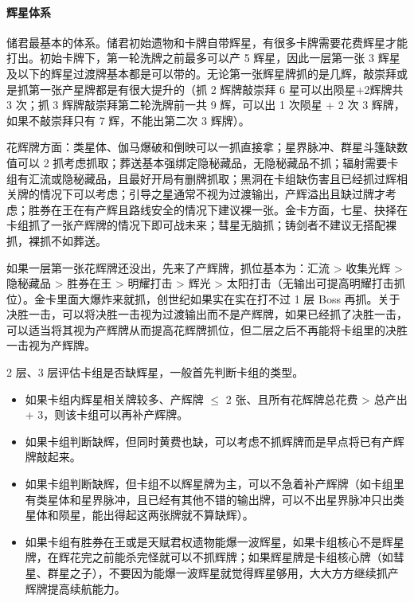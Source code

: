 ﻿\documentclass[12pt, a4paper]{article}
\begin{document}
\paragraph{辉星体系}
储君最基本的体系。储君初始遗物和卡牌自带辉星，有很多卡牌需要花费辉星才能打出。初始卡牌下，第一轮洗牌之前最多可以产 5 辉星，因此一层第一张 3 辉星及以下的辉星过渡牌基本都是可以带的。无论第一张辉星牌抓的是几辉，敲崇拜或是抓第一张产星牌都是有很大提升的（抓 2 辉牌敲崇拜 6 星可以出陨星+2辉牌共 3 次；抓 3 辉牌敲崇拜第二轮洗牌前一共 9 辉，可以出 1 次陨星 + 2 次 3 辉牌，如果不敲崇拜只有 7 辉，不能出第二次 3 辉牌）。

花辉牌方面：类星体、伽马爆破和倒映可以一抓直接拿；星界脉冲、群星斗篷缺数值可以 2 抓考虑抓取；葬送基本强绑定隐秘藏品，无隐秘藏品不抓；辐射需要卡组有汇流或隐秘藏品，且最好开局有删牌抓取；黑洞在卡组缺伤害且已经抓过辉相关牌的情况下可以考虑；引导之星通常不视为过渡输出，产辉溢出且缺过牌才考虑；胜券在王在有产辉且路线安全的情况下建议裸一张。金卡方面，七星、抉择在卡组抓了一张产辉牌的情况下即可战未来；彗星无脑抓；铸剑者不建议无搭配裸抓，裸抓不如葬送。

如果一层第一张花辉牌还没出，先来了产辉牌，抓位基本为：汇流 \textgreater{} 收集光辉 \textgreater{} 隐秘藏品 \textgreater{} 胜券在王 \textgreater{} 明耀打击 \textgreater{} 辉光 \textgreater{} 太阳打击（无输出可提高明耀打击抓位）。金卡里面大爆炸来就抓，创世纪如果实在实在打不过 1 层 Boss 再抓。关于决胜一击，可以将决胜一击视为过渡输出而不是产辉牌，如果已经抓了决胜一击，可以适当将其视为产辉牌从而提高花辉牌抓位，但二层之后不再能将卡组里的决胜一击视为产辉牌。

2 层、3 层评估卡组是否缺辉星，一般首先判断卡组的类型。
\begin{itemize}
    \item 如果卡组内辉星相关牌较多、产辉牌 $\le$ 2 张、且所有花辉牌总花费 \textgreater{} 总产出 + 3，则该卡组可以再补产辉牌。
    \item 如果卡组判断缺辉，但同时黄费也缺，可以考虑不抓辉牌而是早点将已有产辉牌敲起来。
    \item 如果卡组判断缺辉，但卡组不以辉星牌为主，可以不急着补产辉牌（如卡组里有类星体和星界脉冲，且已经有其他不错的输出牌，可以不出星界脉冲只出类星体和陨星，能出得起这两张牌就不算缺辉）。
    \item 如果卡组有胜券在王或是天赋君权遗物能爆一波辉星，如果卡组核心不是辉星牌，在辉花完之前能杀完怪就可以不抓辉牌；如果辉星牌是卡组核心牌（如彗星、群星之子），不要因为能爆一波辉星就觉得辉星够用，大大方方继续抓产辉牌提高续航能力。
\end{itemize}
\end{document}

